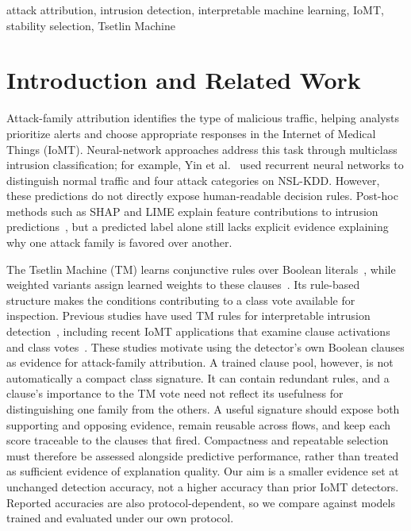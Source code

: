 \documentclass[conference]{IEEEtran}
\begin{document}
\begin{IEEEkeywords}
attack attribution, intrusion detection, interpretable machine learning,
IoMT, stability selection, Tsetlin Machine
\end{IEEEkeywords}

\section{Introduction and Related Work}
Attack-family attribution identifies the type of malicious traffic,
helping analysts prioritize alerts and choose appropriate responses in
the Internet of Medical Things (IoMT). Neural-network approaches address
this task through multiclass intrusion classification; for example,
Yin et al.~\cite{yin2017} used recurrent neural networks to distinguish
normal traffic and four attack categories on NSL-KDD. However, these
predictions do not directly expose human-readable decision rules.
Post-hoc methods such as SHAP and LIME explain feature contributions to
intrusion predictions~\cite{xaiids2025}, but a predicted label alone
still lacks explicit evidence explaining why one attack family is
favored over another.

The Tsetlin Machine (TM) learns conjunctive rules over Boolean
literals~\cite{granmo2018}, while weighted variants assign learned
weights to these clauses~\cite{phoulady2020}. Its rule-based structure
makes the conditions contributing to a class vote available for
inspection. Previous studies have used TM rules for interpretable
intrusion detection~\cite{abeyrathna2020}, including recent IoMT
applications that examine clause activations and class
votes~\cite{jaiswal2026iomt}. These studies motivate
using the detector's own Boolean clauses as evidence for attack-family
attribution. A trained clause pool, however, is not automatically a compact class
signature. It can contain redundant rules, and a clause's importance
to the TM vote need not reflect its usefulness for distinguishing one
family from the others. A useful signature should expose both
supporting and opposing evidence, remain reusable across flows, and
keep each score traceable to the clauses that fired. Compactness and
repeatable selection must therefore be assessed alongside predictive
performance, rather than treated as sufficient evidence of explanation
quality. {\color{blue}%
Our aim is a smaller evidence set at unchanged detection
accuracy, not a higher accuracy than prior IoMT detectors. Reported
accuracies are also protocol-dependent, so we compare against models
trained and evaluated under our own protocol.%
}
\end{document}

